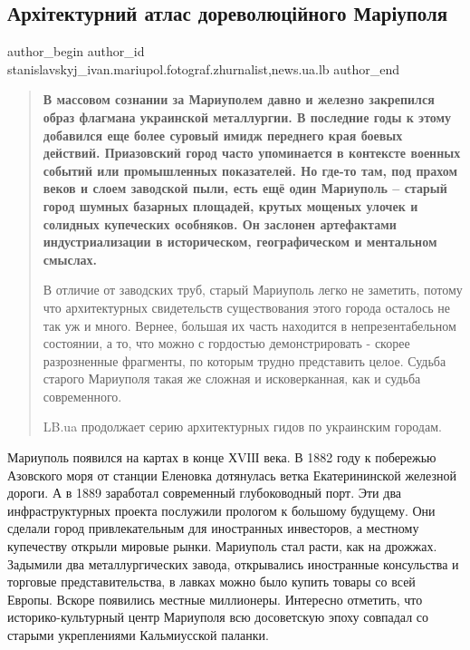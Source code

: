 
 
 
 
 
 
\subsection{Архітектурний атлас дореволюційного Маріуполя}
\label{sec:04_01_2019.stz.news.ua.lb.1.arhitekturnyj_atlas_dorevoljucijnogo_mariupolja}
 
\ifcmt
 author_begin
   author_id stanislavskyj_ivan.mariupol.fotograf.zhurnalist,news.ua.lb
 author_end
\fi

\begin{quote}
\bfseries
В массовом сознании за Мариуполем давно и железно закрепился образ флагмана
украинской металлургии. В последние годы к этому добавился еще более суровый
имидж переднего края боевых действий. Приазовский город часто упоминается в
контексте военных событий или промышленных показателей. Но где-то там, под
прахом веков и слоем заводской пыли, есть ещё один Мариуполь – старый город
шумных базарных площадей, крутых мощеных улочек и солидных купеческих
особняков. Он заслонен артефактами индустриализации в историческом,
географическом и ментальном смыслах.

В отличие от заводских труб, старый Мариуполь легко не заметить, потому что
архитектурных свидетельств существования этого города осталось не так уж и
много. Вернее, большая их часть находится в непрезентабельном состоянии, а то,
что можно с гордостью демонстрировать - скорее разрозненные фрагменты, по
которым трудно представить целое. Судьба старого Мариуполя такая же сложная и
исковерканная, как и судьба современного.

LB.ua продолжает серию архитектурных гидов по украинским городам.
\end{quote}

Мариуполь появился на картах в конце ХVІІІ века. В 1882 году к побережью
Азовского моря от станции Еленовка дотянулась ветка Екатерининской железной
дороги. А в 1889 заработал современный глубоководный порт. Эти два
инфраструктурных проекта послужили прологом к большому будущему. Они сделали
город привлекательным для иностранных инвесторов, а местному купечеству открыли
мировые рынки. Мариуполь стал расти, как на дрожжах. Задымили два
металлургических завода, открывались иностранные консульства и торговые
представительства, в лавках можно было купить товары со всей Европы. Вскоре
появились местные миллионеры. Интересно отметить, что историко-культурный центр
Мариуполя всю досоветскую эпоху совпадал со старыми укреплениями Кальмиусской
паланки.

